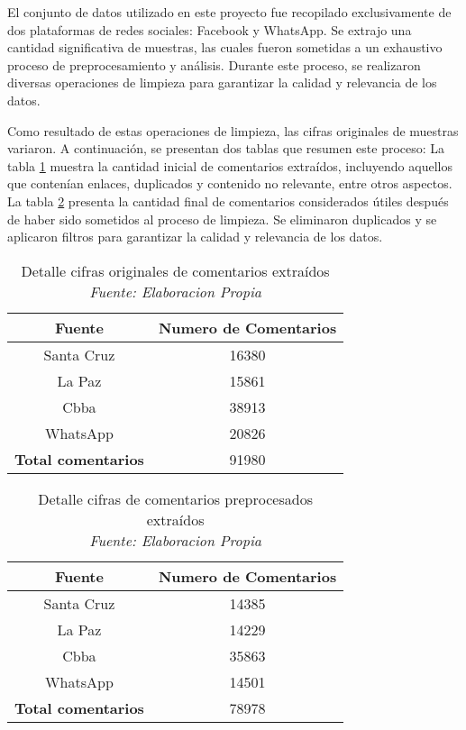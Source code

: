 El conjunto de datos utilizado en este proyecto fue recopilado exclusivamente de dos plataformas de redes sociales: Facebook y WhatsApp. Se extrajo una cantidad significativa de muestras, las cuales fueron sometidas a un exhaustivo proceso de preprocesamiento y análisis. Durante este proceso, se realizaron diversas operaciones de limpieza para garantizar la calidad y relevancia de los datos.

Como resultado de estas operaciones de limpieza, las cifras originales de muestras variaron. A continuación, se presentan dos tablas que resumen este proceso: La tabla \ref{tbl:14} muestra la cantidad inicial de comentarios extraídos, incluyendo aquellos que contenían enlaces, duplicados y contenido no relevante, entre otros aspectos. La tabla \ref{tbl:15} presenta la cantidad final de comentarios considerados útiles después de haber sido sometidos al proceso de limpieza. Se eliminaron duplicados y se aplicaron filtros para garantizar la calidad y relevancia de los datos.

\begin{table}[!ht]
	\centering
	\begin{tabular}{|c|c|}
		\hline
		\textbf{Fuente} & \textbf{Numero de Comentarios} \\ \hline
		Santa Cruz & 16380 \\ 
		La Paz & 15861 \\ 
		Cbba & 38913 \\ 
		WhatsApp & 20826 \\ \hline
		\textbf{Total comentarios} & 91980 \\ \hline
	\end{tabular}
	\caption{Detalle cifras originales de comentarios extraídos
		\\\textit{Fuente: Elaboracion Propia}}
	\label{tbl:14}
\end{table}

\begin{table}[!ht]
	\centering
	\begin{tabular}{|c|c|}
		\hline
		\textbf{Fuente} & \textbf{Numero de Comentarios} \\ \hline
		Santa Cruz & 14385 \\ 
		La Paz & 14229 \\ 
		Cbba & 35863 \\ 
		WhatsApp & 14501 \\ \hline
		\textbf{Total comentarios} & 78978 \\ \hline
	\end{tabular}
	\caption{Detalle cifras de comentarios preprocesados extraídos
		\\\textit{Fuente: Elaboracion Propia}}
	\label{tbl:15}
\end{table}


